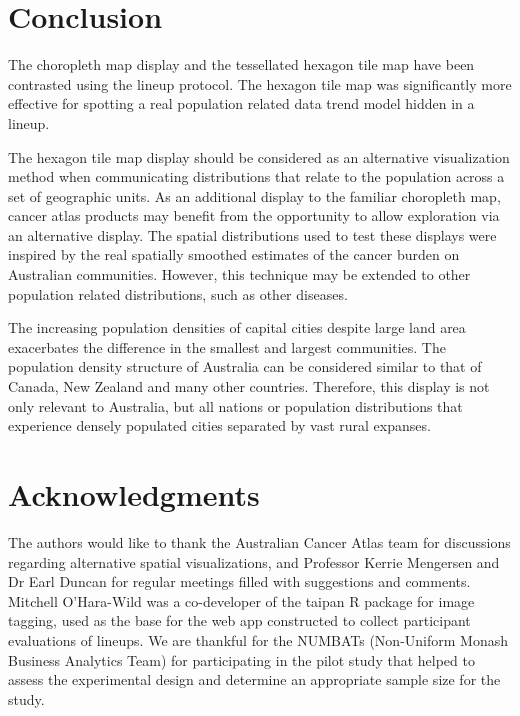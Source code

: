 \documentclass[
doublespace,
  times]{anzsauth}
\begin{document}
\section{Conclusion}\label{conclusion}

The choropleth map display and the tessellated hexagon tile map have
been contrasted using the lineup protocol. The hexagon tile map was
significantly more effective for spotting a real population related data
trend model hidden in a lineup.

The hexagon tile map display should be considered as an alternative
visualization method when communicating distributions that relate to the
population across a set of geographic units. As an additional display to
the familiar choropleth map, cancer atlas products may benefit from the
opportunity to allow exploration via an alternative display. The spatial
distributions used to test these displays were inspired by the real
spatially smoothed estimates of the cancer burden on Australian
communities. However, this technique may be extended to other population
related distributions, such as other diseases.

The increasing population densities of capital cities despite large land
area exacerbates the difference in the smallest and largest communities.
The population density structure of Australia can be considered similar
to that of Canada, New Zealand and many other countries. Therefore, this
display is not only relevant to Australia, but all nations or population
distributions that experience densely populated cities separated by vast
rural expanses.

\section*{Acknowledgments}\label{acknowledgments}

The authors would like to thank the Australian Cancer Atlas team for
discussions regarding alternative spatial visualizations, and Professor
Kerrie Mengersen and Dr Earl Duncan for regular meetings filled with
suggestions and comments. Mitchell O'Hara-Wild was a co-developer of the
taipan \citep{taipan} R package for image tagging, used as the base for
the web app constructed to collect participant evaluations of lineups.
We are thankful for the NUMBATs (Non-Uniform Monash Business Analytics
Team) for participating in the pilot study that helped to assess the
experimental design and determine an appropriate sample size for the
study.
\end{document}
